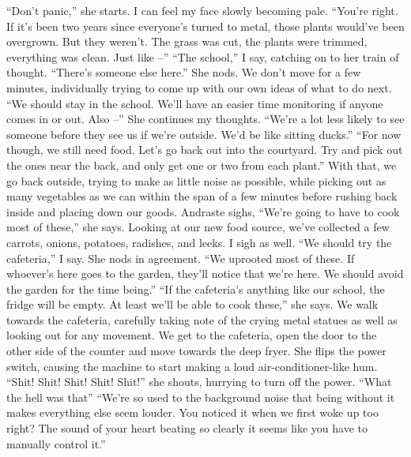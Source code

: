 \documentclass[a4paper, 12pt]{book}
\newcommand\tab[1][1cm]{\hspace*{#1}}
\begin{document}
\newline
\tab
``Don’t panic,'' she starts. I can feel my face slowly becoming pale. ``You’re right. If it’s been two years since everyone’s turned to metal, those plants would’ve been overgrown. But they weren’t. The grass was cut, the plants were trimmed, everything was clean. Just like --''
\newline
\tab
``The school,'' I say, catching on to her train of thought. ``There’s someone else here.'' She nods. We don’t move for a few minutes, individually trying to come up with our own ideas of what to do next. ``We should stay in the school. We’ll have an easier time monitoring if anyone comes in or out. Also --''
\newline
\tab
She continues my thoughts. ``We’re a lot less likely to see someone before they see us if we’re outside. We’d be like sitting ducks.''
\newline
\tab
``For now though, we still need food. Let’s go back out into the courtyard. Try and pick out the ones near the back, and only get one or two from each plant.'' With that, we go back outside, trying to make as little noise as possible, while picking out as many vegetables as we can within the span of a few minutes before rushing back inside and placing down our goods.
\newline
\tab
Andraste sighs, ``We’re going to have to cook most of these,'' she says. Looking at our new food source, we’ve collected a few carrots, onions, potatoes, radishes, and leeks. I sigh as well.
\newline
\tab
``We should try the cafeteria,'' I say. She nods in agreement. ``We uprooted most of these. If whoever’s here goes to the garden, they’ll notice that we’re here. We should avoid the garden for the time being.''
\newline
\tab
``If the cafeteria’s anything like our school, the fridge will be empty. At least we’ll be able to cook these,'' she says. We walk towards the cafeteria, carefully taking note of the crying metal statues as well as looking out for any movement.
\newline
\tab
We get to the cafeteria, open the door to the other side of the counter and move towards the deep fryer. She flips the power switch, causing the machine to start making a loud air-conditioner-like hum. ``Shit! Shit! Shit! Shit! Shit!'' she shouts, hurrying to turn off the power. ``What the hell was that\textinterrobang''
\newline
\tab
``We’re so used to the background noise that being without it makes everything else seem louder. You noticed it when we first woke up too right? The sound of your heart beating so clearly it seems like you have to manually control it.''
\end{document}
